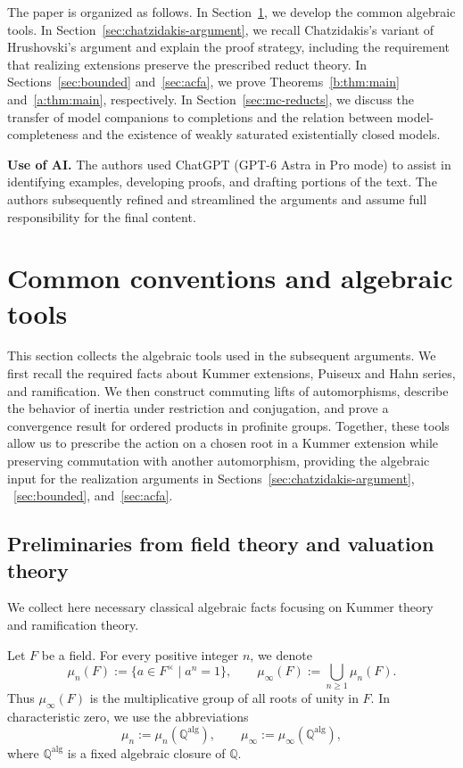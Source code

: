 \documentclass[11pt,a4paper]{amsart}
\renewcommand{\ge}{\geqslant}
\theoremstyle{definition}
\newcommand{\Q}{\mathbb Q}
\newcommand{\alg}{\mathrm{alg}}
\begin{document}
The paper is organized as follows.
In Section~\ref{sec:tools}, we develop the common algebraic tools.
In Section~\ref{sec:chatzidakis-argument}, we recall Chatzidakis's
variant of Hrushovski's argument and explain the proof strategy,
including the requirement that realizing extensions preserve
the prescribed reduct theory.
In Sections~\ref{sec:bounded} and~\ref{sec:acfa}, we prove
Theorems~\ref{b:thm:main} and~\ref{a:thm:main}, respectively.
In Section~\ref{sec:mc-reducts}, we discuss the transfer of model
companions to completions and the
relation between model-completeness and the existence of
weakly saturated existentially closed models.

\medskip
\noindent
\textbf{Use of AI.}
The authors used ChatGPT (GPT-6 Astra in Pro mode) to assist in identifying examples, developing proofs, and drafting portions of the text. The authors subsequently refined and streamlined the arguments and assume full responsibility for the final content.





\section{Common conventions and algebraic tools}\label{sec:tools}
This section collects the algebraic tools used in the subsequent
arguments. We first recall the required facts about 
Kummer extensions, Puiseux and Hahn series, and ramification.
We then construct commuting lifts of automorphisms, describe the
behavior of inertia under restriction and conjugation, and prove
a convergence result for ordered products in profinite groups.
Together, these tools allow us to prescribe the action on a chosen root in a Kummer extension while preserving commutation with another automorphism,
providing the algebraic input for the realization arguments in
Sections~\ref{sec:chatzidakis-argument}, ~\ref{sec:bounded}, and~\ref{sec:acfa}.

\subsection{Preliminaries from field theory and valuation theory}
We collect here necessary classical algebraic facts focusing on Kummer theory and ramification theory.

Let $F$ be a field. For every positive integer $n$, we denote
\[
\mu_n(F):=\{a\in F^\times\mid a^n=1\},
\qquad
\mu_\infty(F):=\bigcup_{n\ge1}\mu_n(F).
\]
Thus $\mu_\infty(F)$ is the multiplicative group of all
roots of unity in $F$. In characteristic zero, we use
the abbreviations
\[
\mu_n:=\mu_n(\Q^{\alg}),
\qquad
\mu_\infty:=\mu_\infty(\Q^{\alg}),
\]
where $\Q^{\alg}$ is a fixed algebraic closure of $\Q$.
\end{document}
